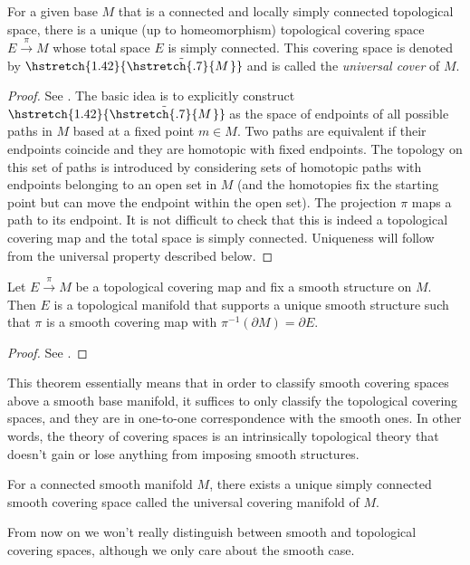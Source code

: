 \documentclass[english,letterpaper]{article}%
\numberwithin{equation}{section}
\numberwithin{figure}{section}
\numberwithin{table}{section}
\theoremstyle{definition}
\theoremstyle{definition}
\theoremstyle{definition}
\theoremstyle{plain}
\theoremstyle{plain}
\theoremstyle{plain}
\theoremstyle{plain}
\theoremstyle{remark}
\theoremstyle{remark}
\newcommand\wt[1]{\hstretch{1.42}{\tilde{\hstretch{.7}{#1\mkern2mu}}}\mkern-2mu}
\begin{document}
\begin{thm}
For a given base $M$ that is a connected and locally simply connected topological space, there is a unique (up to homeomorphism) topological covering space $E\overset{\pi}{\to}M$ whose total space $E$ is simply connected. This covering space is denoted by $\wt M$ and is called the \emph{universal cover} of $M$.
\end{thm}
\begin{proof}
See \cite[Thm 11.43]{LeeTop}. The basic idea is to explicitly construct $\wt M$ as the space of endpoints of all possible paths in $M$ based at a fixed point $m\in M$. Two paths are equivalent if their endpoints coincide and they are homotopic with fixed endpoints. The topology on this set of paths is introduced by considering sets of homotopic paths with endpoints belonging to an open set in $M$ (and the homotopies fix the starting point but can move the endpoint within the open set). The projection $\pi$ maps a path to its endpoint. It is not difficult to check that this is indeed a topological covering map and the total space is simply connected. Uniqueness will follow from the universal property described below.
\end{proof}


\begin{thm}
Let $E\overset{\pi}{\to}M$ be a topological covering map and fix a smooth structure on $M$. Then $E$ is a topological manifold that supports a unique smooth structure such that $\pi$ is a smooth covering map with $\pi^{-1}(\partial M)=\partial E$.
\end{thm}
\begin{proof}
See \cite[Prop 4.40]{Lee}.
\end{proof}
This theorem essentially means that in order to classify smooth covering spaces above a smooth base manifold, it suffices to only classify the topological covering spaces, and they are in one-to-one correspondence with the smooth ones. In other words, the theory of covering spaces is an intrinsically topological theory that doesn't gain or lose anything from imposing smooth structures.

\begin{cor}
For a connected smooth manifold $M$, there exists a unique simply connected smooth covering space called the universal covering manifold of $M$.
\end{cor}
From now on we won't really distinguish between smooth and topological covering spaces, although we only care about the smooth case.
\end{document}
